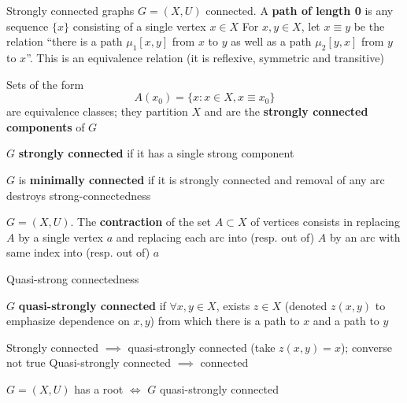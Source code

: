 \documentclass[aspectratio=43]{beamer}
\begin{document}
	
	\begin{frame}{Strongly connected graphs}
		$G=(X,U)$ connected. 
		A \textbf{path of length 0} is any sequence $\{x\}$ consisting of a single vertex $x\in X$
		\vfill
		For $x,y\in X$, let $x\equiv y$ be the relation ``there is a path $\mu_1[x,y]$ from $x$ to $y$ as well as a path $\mu_2[y,x]$ from $y$ to $x$''. This is an equivalence relation (it is reflexive, symmetric and transitive)
		\vfill
		\begin{definition}\label{def:strong_components}
		Sets of the form 
		\[
		A(x_0)=\{x:x\in X, x\equiv x_0\}	
		\]
		are equivalence classes; they partition $X$ and are the \textbf{strongly connected components} of $G$	
		\end{definition}
		\vfill
		\begin{definition}
		\label{def:strongly_connected_graph}
		$G$ \textbf{strongly connected} if it has a single strong component
		\end{definition}
\end{frame}
		

\begin{frame}
	\begin{definition}
	$G$ is \textbf{minimally connected} if it is strongly connected and removal of any arc destroys strong-connectedness
	\end{definition}
	\vfill
	\begin{definition}[Contraction]
	$G=(X,U)$. The \textbf{contraction} of the set $A\subset X$ of vertices consists in replacing $A$ by a single vertex $a$ and replacing each arc into (resp. out of) $A$ by an arc with same index into (resp. out of) $a$
	\end{definition}
\end{frame}
	
		
\begin{frame}{Quasi-strong connectedness}
	\begin{definition}
	$G$ \textbf{quasi-strongly connected} if $\forall x,y\in X$, exists $z\in X$ (denoted $z(x,y)$ to emphasize dependence on $x,y$) from which there is a path to $x$ and a path to $y$
	\end{definition}
	\vfill
	Strongly connected $\implies$ quasi-strongly connected (take $z(x,y)=x$); converse not true
	\vfill
	Quasi-strongly connected $\implies$ connected
	\vfill
	\begin{lemma}
	$G=(X,U)$ has a root $\iff$ $G$ quasi-strongly connected
	\end{lemma}
\end{frame}
\end{document}
